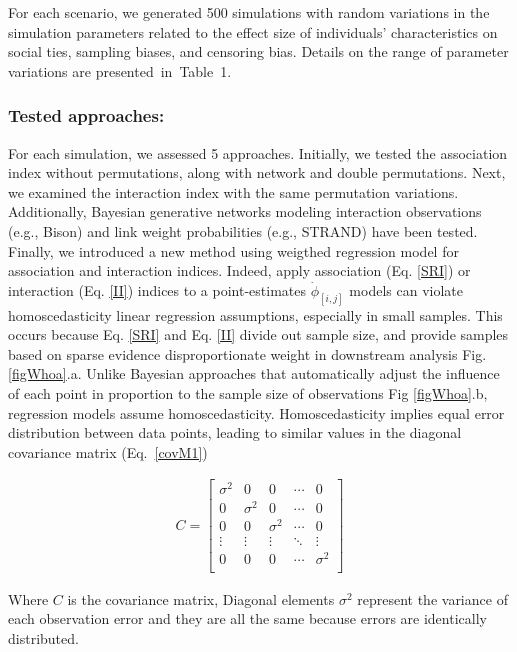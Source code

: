 \documentclass[Afour,sageh,times]{sagej}
\begin{document}
For each scenario, we generated 500 simulations with random variations in the simulation parameters related to the effect size of individuals' characteristics on social ties, sampling biases, and censoring bias. Details on the range of parameter variations are presented in Table 1.

\subsubsection{Tested approaches:}
For each simulation, we assessed 5 approaches. Initially, we tested the association index without permutations, along with network and double permutations. Next, we examined the interaction index with the same permutation variations. Additionally, Bayesian generative networks modeling interaction observations (e.g., Bison) and link weight probabilities (e.g., STRAND) have been tested. Finally, we introduced a new method using weigthed regression model for association and interaction indices. 
\newline
Indeed, apply association (Eq. \ref{SRI}) or interaction (Eq. \ref{II}) indices to a point-estimates $\dot\phi_{[i,j]}$ models can violate homoscedasticity linear regression assumptions, especially in small samples. This occurs because Eq. \ref{SRI} and Eq. \ref{II} divide out sample size, and provide samples based on sparse evidence disproportionate weight in downstream analysis Fig. \ref{figWhoa}.a. Unlike Bayesian approaches that automatically adjust the influence of each point in proportion to the sample size of observations Fig \ref{figWhoa}.b, regression models assume homoscedasticity. Homoscedasticity implies equal error distribution between data points, leading to similar values in the diagonal covariance matrix  (Eq. \ref{covM1})

\begin{ceqn}
  \begin{align}\label{covM1}
    C = 
    \begin{bmatrix}
      \sigma^2  & 0 & 0 & \cdots & 0  \\
      0 & \sigma^2 & 0 & \cdots & 0\\
      0 & 0 & \sigma^2 & \cdots & 0\\
      \vdots  &  \vdots &  \vdots & \ddots &  \vdots \\
      0 & 0 & 0 & \cdots & \sigma^2 \\
      \end{bmatrix}
  \end{align}
  \end{ceqn}
  Where $C$ is the covariance matrix, Diagonal elements $\sigma^2$ represent the variance of each observation error and they are all the same because errors are identically distributed.
\end{document}
